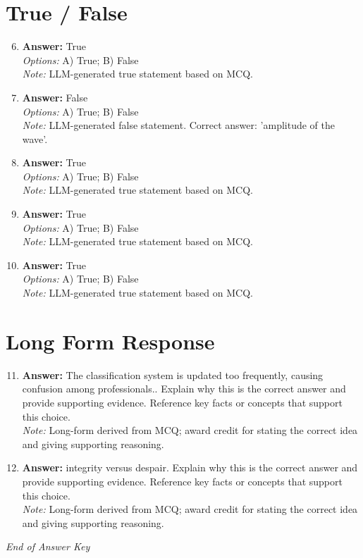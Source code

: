 \documentclass[12pt]{article}
\begin{document}
\section*{True / False}
\begin{enumerate}[label=\arabic*.]
\setcounter{enumi}{5}
\item \textbf{Answer:} True
\\ \textit{Options:} A) True; B) False
\\ \textit{Note:} LLM-generated true statement based on MCQ.
\item \textbf{Answer:} False
\\ \textit{Options:} A) True; B) False
\\ \textit{Note:} LLM-generated false statement. Correct answer: 'amplitude of the wave'.
\item \textbf{Answer:} True
\\ \textit{Options:} A) True; B) False
\\ \textit{Note:} LLM-generated true statement based on MCQ.
\item \textbf{Answer:} True
\\ \textit{Options:} A) True; B) False
\\ \textit{Note:} LLM-generated true statement based on MCQ.
\item \textbf{Answer:} True
\\ \textit{Options:} A) True; B) False
\\ \textit{Note:} LLM-generated true statement based on MCQ.
\end{enumerate}

\section*{Long Form Response}
\begin{enumerate}[label=\arabic*.]
\setcounter{enumi}{10}
\item \textbf{Answer:} The classification system is updated too frequently, causing confusion among professionals.. Explain why this is the correct answer and provide supporting evidence. Reference key facts or concepts that support this choice.
\\ \textit{Note:} Long-form derived from MCQ; award credit for stating the correct idea and giving supporting reasoning.
\item \textbf{Answer:} integrity versus despair. Explain why this is the correct answer and provide supporting evidence. Reference key facts or concepts that support this choice.
\\ \textit{Note:} Long-form derived from MCQ; award credit for stating the correct idea and giving supporting reasoning.
\end{enumerate}

\vfill
\noindent\textit{End of Answer Key}
\end{document}
